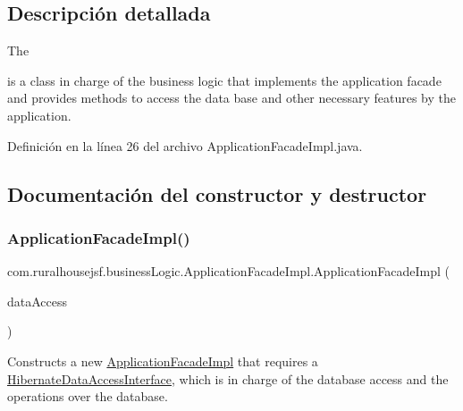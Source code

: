 \subsection{Descripción detallada}
The
\begin{DoxyCode}{0}
\end{DoxyCode}
 is a class in charge of the business logic that implements the application facade and provides methods to access the data base and other necessary features by the application. 

Definición en la línea 26 del archivo Application\+Facade\+Impl.\+java.



\subsection{Documentación del constructor y destructor}
\mbox{\label{classcom_1_1ruralhousejsf_1_1business_logic_1_1_application_facade_impl_ad6ed360c754c5ba82a2b88bb4cf036f7}} 
\subsubsection{\texorpdfstring{ApplicationFacadeImpl()}{ApplicationFacadeImpl()}}
{\footnotesize\ttfamily com.\+ruralhousejsf.\+business\+Logic.\+Application\+Facade\+Impl.\+Application\+Facade\+Impl (\begin{DoxyParamCaption}\item[{\mbox{\hyperlink{interfacecom_1_1ruralhousejsf_1_1data_access_1_1_hibernate_data_access_interface}{Hibernate\+Data\+Access\+Interface}}}]{data\+Access }\end{DoxyParamCaption})}

Constructs a new \mbox{\hyperlink{classcom_1_1ruralhousejsf_1_1business_logic_1_1_application_facade_impl}{Application\+Facade\+Impl}} that requires a \mbox{\hyperlink{}{Hibernate\+Data\+Access\+Interface}}, which is in charge of the database access and the operations over the database.


